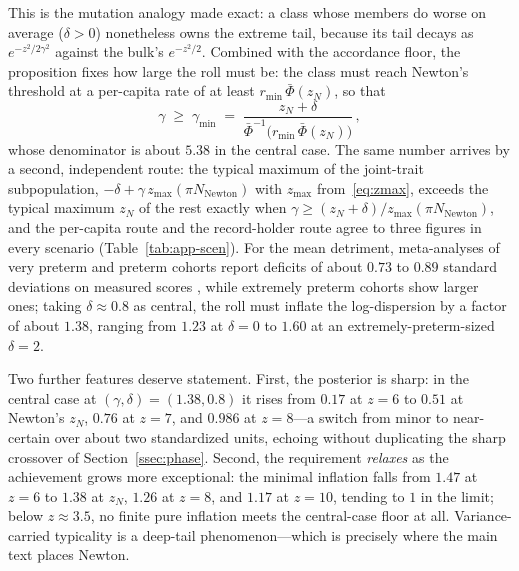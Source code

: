 \documentclass{article}
\begin{document}
\medskip
\noindent This is the mutation analogy made exact: a class whose members do worse on average ($\delta > 0$) nonetheless owns the extreme tail, because its tail decays as $e^{-z^{2}/2\gamma^{2}}$ against the bulk's $e^{-z^{2}/2}$. Combined with the accordance floor, the proposition fixes how large the roll must be: the class must reach Newton's threshold at a per-capita rate of at least $r_{\min}\,\bar\Phi(z_N)$, so that
\begin{equation}\label{eq:app-gmin}
  \gamma \;\geq\; \gamma_{\min} \;=\; \frac{z_N + \delta}{\bar\Phi^{-1}\bigl(r_{\min}\,\bar\Phi(z_N)\bigr)}\,,
\end{equation}
whose denominator is about $5.38$ in the central case. The same number arrives by a second, independent route: the typical maximum of the joint-trait subpopulation, $-\delta + \gamma\, z_{\max}(\pi N_{\mathrm{Newton}})$ with $z_{\max}$ from~\eqref{eq:zmax}, exceeds the typical maximum $z_N$ of the rest exactly when $\gamma \geq (z_N + \delta)/z_{\max}(\pi N_{\mathrm{Newton}})$, and the per-capita route and the record-holder route agree to three figures in every scenario (Table~\ref{tab:app-scen}). For the mean detriment, meta-analyses of very preterm and preterm cohorts report deficits of about $0.73$ to $0.89$ standard deviations on measured scores \cite{bhutta2002cognitive,twilhaar2018cognitive,eves2021association}, while extremely preterm cohorts show larger ones; taking $\delta \approx 0.8$ as central, the roll must inflate the log-dispersion by a factor of about $1.38$, ranging from $1.23$ at $\delta = 0$ to $1.60$ at an extremely-preterm-sized $\delta = 2$.

Two further features deserve statement. First, the posterior is sharp: in the central case at $(\gamma, \delta) = (1.38, 0.8)$ it rises from $0.17$ at $z = 6$ to $0.51$ at Newton's $z_N$, $0.76$ at $z = 7$, and $0.986$ at $z = 8$---a switch from minor to near-certain over about two standardized units, echoing without duplicating the sharp crossover of Section~\ref{ssec:phase}. Second, the requirement \emph{relaxes} as the achievement grows more exceptional: the minimal inflation falls from $1.47$ at $z = 6$ to $1.38$ at $z_N$, $1.26$ at $z = 8$, and $1.17$ at $z = 10$, tending to $1$ in the limit; below $z \approx 3.5$, no finite pure inflation meets the central-case floor at all. Variance-carried typicality is a deep-tail phenomenon---which is precisely where the main text places Newton.
\end{document}
